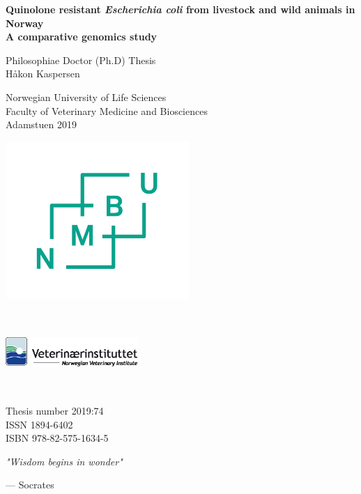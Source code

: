 \frontmatter
{}
{
\pagestyle{empty}
\graphicspath{ {./images/} }
\begin{titlepage}
   \begin{center}
       
       \Large
       
       \textbf{Quinolone resistant \textit{Escherichia coli} from livestock and wild animals in Norway \\ A comparative genomics study}
 
       \vspace{1.5cm}
       
       \normalsize
       Philosophiae Doctor (Ph.D) Thesis\\
       Håkon Kaspersen
 
       \vspace{1cm}
       
       Norwegian University of Life Sciences\\
       Faculty of Veterinary Medicine and Biosciences\\
       Adamstuen 2019
       
       \includegraphics[height=6cm, width=7cm]{nmbu}
       
       \vspace{1cm}
       
       \includegraphics[height=3cm, width=5cm]{vetinst}
       
       \vfill

 
       \vspace{1cm}
 
       Thesis number 2019:74\\
       ISSN 1894-6402\\
       ISBN 978-82-575-1634-5
 
   \end{center}
\end{titlepage}

\begin{titlepage}
   \null
   \vspace*{\fill}
   \renewcommand{\epigraphsize}{\large}
   \epigraph{\textit{"Wisdom begins in wonder"}}{--- \textup{Socrates}}
\end{titlepage}
}